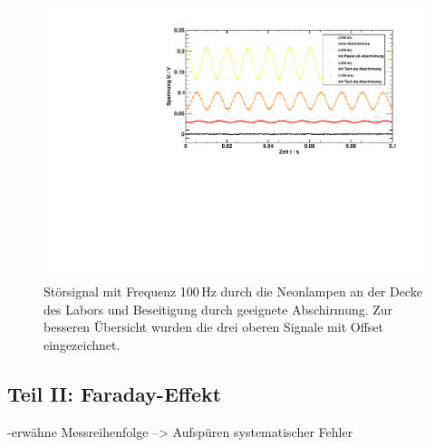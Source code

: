 \begin{figure}[H]
\begin{center}
  \includegraphics[width=\textwidth]{../img/licht.pdf}
  \caption{Störsignal mit Frequenz 100\,Hz durch die Neonlampen an der Decke des Labors und
  Beseitigung durch geeignete Abschirmung.
  Zur besseren Übersicht wurden die drei oberen Signale mit Offset eingezeichnet. }
  \label{img:licht}
\end{center}
\end{figure}


\subsection{Teil II: Faraday-Effekt}
-erwähne Messreihenfolge --> Aufspüren systematischer Fehler